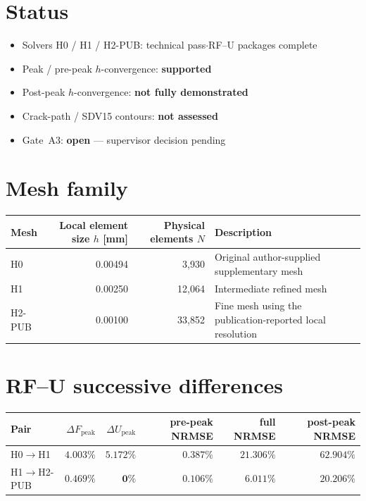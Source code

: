 \documentclass[10pt,a4paper]{article}
\begin{document}
\section*{Status}
\begin{itemize}
  \item Solvers H0 / H1 / H2-PUB: technical pass\quad$\cdot$\quad RF--U packages complete
  \item Peak / pre-peak $h$-convergence: \textbf{supported}
  \item Post-peak $h$-convergence: \textbf{not fully demonstrated}
  \item Crack-path / SDV15 contours: \textbf{not assessed}
  \item Gate~A3: \textbf{open} --- supervisor decision pending
\end{itemize}

\section*{Mesh family}
\begin{center}
\footnotesize
\begin{tabular}{@{}l r r p{6.6cm}@{}}
\toprule
Mesh & Local element size $h$ [mm] & Physical elements $N$ & Description \\
\midrule
H0 & 0.00494 & 3{,}930 & Original author-supplied supplementary mesh \\
H1 & 0.00250 & 12{,}064 & Intermediate refined mesh \\
H2-PUB & 0.00100 & 33{,}852 & Fine mesh using the publication-reported local resolution \\
\bottomrule
\end{tabular}
\end{center}

\section*{RF--U successive differences}
\begin{center}
\footnotesize
\begin{tabular}{@{}lrrrrr@{}}
\toprule
Pair & $\Delta F_\mathrm{peak}$ & $\Delta U_\mathrm{peak}$ & pre-peak NRMSE & full NRMSE & post-peak NRMSE \\
\midrule
H0$\to$H1 & $4.003\%$ & $5.172\%$ & $0.387\%$ & $21.306\%$ & $62.904\%$ \\
H1$\to$H2-PUB & $\mathbf{0.469\%}$ & $\mathbf{0\%}$ & $\mathbf{0.106\%}$ & $\mathbf{6.011\%}$ & $\mathbf{20.206\%}$ \\
\bottomrule
\end{tabular}
\end{center}
\end{document}
